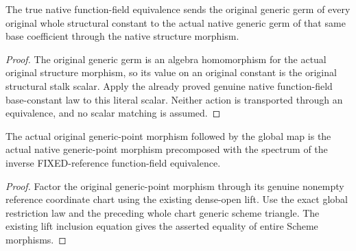 \begin{lemma}
\label{lem:seven-fixed-original-field-actual-constants-route}
\leanok
The true native function-field equivalence sends the original generic germ
of every original whole structural constant to the actual native generic
germ of that same base coefficient through the native structure morphism.
\end{lemma}
\begin{proof}
The original generic germ is an algebra homomorphism for the actual
original structure morphism, so its value on an original constant is the
original structural stalk scalar. Apply the already proved genuine native
function-field base-constant law to this literal scalar. Neither action is
transported through an equivalence, and no scalar matching is assumed.
\end{proof}

\begin{theorem}
\label{thm:seven-original-native-global-generic-triangle-route}
\leanok
{}
The actual original generic-point morphism followed by the global map is
the actual native generic-point morphism precomposed with the spectrum of
the inverse FIXED-reference function-field equivalence.
\end{theorem}
\begin{proof}
Factor the original generic-point morphism through its genuine nonempty
reference coordinate chart using the existing dense-open lift. Use the
exact global restriction law and the preceding whole chart generic scheme
triangle. The existing lift inclusion equation gives the asserted equality
of entire Scheme morphisms.
\end{proof}

